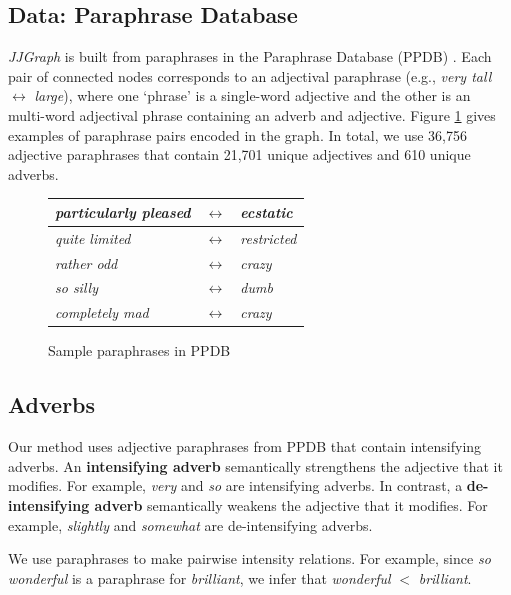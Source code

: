 \documentclass[11pt,a4paper]{article}
\begin{document}
\subsection{Data: Paraphrase Database}

\textit{JJGraph} is built from paraphrases in the Paraphrase Database (PPDB) \cite{pavlick-EtAl:2015:ACL-IJCNLP3}. Each pair of connected nodes corresponds to an adjectival paraphrase (e.g., \textit{very tall} $\leftrightarrow$ \textit{large}), where one `phrase' is a single-word adjective and the other is an multi-word adjectival phrase containing an adverb and adjective. Figure \ref{fig:adjexamples} gives examples of paraphrase pairs encoded in the graph. In total, we use 36,756 adjective paraphrases that contain 21,701 unique adjectives and 610 unique adverbs.  

\begin{figure}[t]
\begin{center}
\begin{tabular}{| l c l |}
 \hline
 \textit{particularly pleased} & $\leftrightarrow$ & \textit{ecstatic} \\ 
 \hline
 \textit{quite limited} & $\leftrightarrow$ & \textit{restricted} \\ 
 \hline 
 \textit{rather odd} & $\leftrightarrow$ & \textit{crazy} \\
 \hline
 \textit{so silly} & $\leftrightarrow$ & \textit{dumb} \\
 \hline
 \textit{completely mad} & $\leftrightarrow$ & \textit{crazy} \\
 \hline
\end{tabular}
\end{center}
\caption{Sample paraphrases in PPDB}
\label{fig:adjexamples}
\end{figure} 

\subsection{Adverbs}

Our method uses adjective paraphrases from PPDB that contain intensifying adverbs. An \textbf{intensifying adverb} semantically strengthens the adjective that it modifies. For example, \textit{very} and \textit{so} are intensifying adverbs. In contrast, a \textbf{de-intensifying adverb} semantically weakens the adjective that it modifies. For example, \textit{slightly} and \textit{somewhat} are de-intensifying adverbs. 

We use paraphrases to make pairwise intensity relations. For example, since \textit{so wonderful} is a paraphrase for \textit{brilliant}, we infer that \textit{wonderful} $<$ \textit{brilliant}. %
\end{document}
